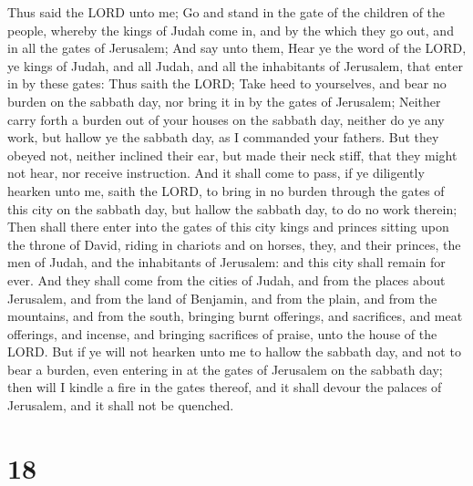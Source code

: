  Thus said the LORD unto me; Go and stand in the gate of
the children of the people, whereby the kings of Judah come in, and by
the which they go out, and in all the gates of Jerusalem;
 And say unto them, Hear ye the word of the LORD, ye
kings of Judah, and all Judah, and all the inhabitants of Jerusalem,
that enter in by these gates:  Thus saith the LORD; Take
heed to yourselves, and bear no burden on the sabbath day, nor bring it
in by the gates of Jerusalem;  Neither carry forth a
burden out of your houses on the sabbath day, neither do ye any work,
but hallow ye the sabbath day, as I commanded your fathers.
 But they obeyed not, neither inclined their ear, but
made their neck stiff, that they might not hear, nor receive
instruction.  And it shall come to pass, if ye diligently
hearken unto me, saith the LORD, to bring in no burden through the gates
of this city on the sabbath day, but hallow the sabbath day, to do no
work therein;  Then shall there enter into the gates of
this city kings and princes sitting upon the throne of David, riding in
chariots and on horses, they, and their princes, the men of Judah, and
the inhabitants of Jerusalem: and this city shall remain for ever.
 And they shall come from the cities of Judah, and from
the places about Jerusalem, and from the land of Benjamin, and from the
plain, and from the mountains, and from the south, bringing burnt
offerings, and sacrifices, and meat offerings, and incense, and bringing
sacrifices of praise, unto the house of the LORD.  But if
ye will not hearken unto me to hallow the sabbath day, and not to bear a
burden, even entering in at the gates of Jerusalem on the sabbath day;
then will I kindle a fire in the gates thereof, and it shall devour the
palaces of Jerusalem, and it shall not be quenched.

\hypertarget{section-17}{%
\section{18}\label{section-17}}

